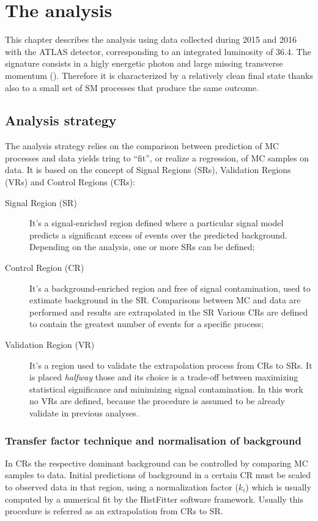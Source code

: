 \chapter{The \mph analysis}
\label{chapt:mph}
\lettrine{T}{}his chapter describes the \mph analysis using data collected during 2015 and 2016 with the ATLAS detector, corresponding to an integrated luminosity of \SI{36.4}{\ifb}.
The \mph signature consists in a higly energetic photon and large missing transverse momentum (\met). Therefore it is characterized by a relatively clean final state thanks also to a small set of SM processes that produce the same outcome.

\section{Analysis strategy}
The \mph analysis strategy relies on the comparison between prediction of MC processes and data yields tring to ``fit'', or realize a regression, of MC samples on data. It is based on the concept of Signal Regions (SRs), Validation Regions (VRs) and Control Regions (CRs):
\begin{description}
\item[Signal Region (SR)] It's a signal-enriched region defined where a particular signal model predicts a significant excess of events over the predicted background. Depending on the analysis, one or more SRs can be defined;
\item[Control Region (CR)] It's a background-enriched region and free of signal contamination, used to extimate background in the SR. Comparisons between MC and data are performed and results are extrapolated in the SR Various CRs are defined to contain the greatest number of events for a specific process;
\item[Validation Region (VR)] It's a region used to validate the extrapolation process from CRs to SRs. It is placed \emph{halfway} those and its choice is a trade-off between maximizing statistical significance and minimizing signal contamination. In this work no VRs are defined, because the procedure is assumed to be already validate in previous analyses.
\end{description}

\subsection{Transfer factor technique and normalisation of background}
\label{sec:kfactor}
In CRs the respective dominant background can be controlled by comparing MC samples to data. Initial predictions of background in a certain CR must be scaled to observed data in that region, using a normalization factor ($k_{i}$) which is usually computed by a numerical fit by the HistFitter software framework. Usually this procedure is referred as an extrapolation from CRs to SR.

